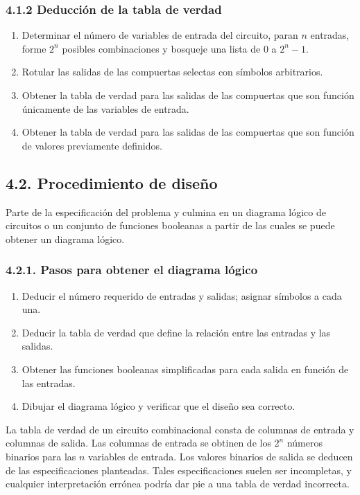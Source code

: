 \subsubsection*{4.1.2 Deducci\'{o}n de la tabla de verdad}
\begin{enumerate}
    \item Determinar el n\'{u}mero de variables de entrada del circuito, paran $n$ entradas,
          forme $2^n$ posibles combinaciones y bosqueje una lista de $0$ a $2^n - 1$.
    \item Rotular las salidas de las compuertas selectas con s\'{i}mbolos arbitrarios.
    \item Obtener la tabla de verdad para las salidas de las compuertas que son funci\'{o}n
          \'{u}nicamente de las variables de entrada.
    \item Obtener la tabla de verdad para las salidas de las compuertas que son funci\'{o}n
          de valores previamente definidos.
\end{enumerate}

\subsection*{4.2. Procedimiento de dise\~{n}o}
Parte de la especificaci\'{o}n del problema y culmina en un diagrama l\'{o}gico de circuitos
o un conjunto de funciones booleanas a partir de las cuales se puede obtener un diagrama l\'{o}gico.

\subsubsection*{4.2.1. Pasos para obtener el diagrama l\'{o}gico}
\begin{enumerate}
    \item Deducir el n\'{u}mero requerido de entradas y salidas; asignar s\'{i}mbolos a cada una.
    \item Deducir la tabla de verdad que define la relaci\'{o}n  entre las entradas y las salidas.
    \item Obtener las funciones booleanas simplificadas para cada salida en funci\'{o}n de las entradas.
    \item Dibujar el diagrama l\'{o}gico y verificar que el dise\~{n}o sea correcto.
\end{enumerate}

La tabla de verdad de un circuito combinacional consta de columnas de entrada y columnas de salida.
Las columnas de entrada se obtinen de los $2^n$ n\'{u}meros binarios para las $n$ variables de entrada.
Los valores binarios de salida se deducen de las especificaciones planteadas. Tales especificaciones
suelen ser incompletas, y cualquier interpretaci\'{o}n err\'{o}nea podr\'{i}a dar pie a una tabla de verdad
incorrecta.

